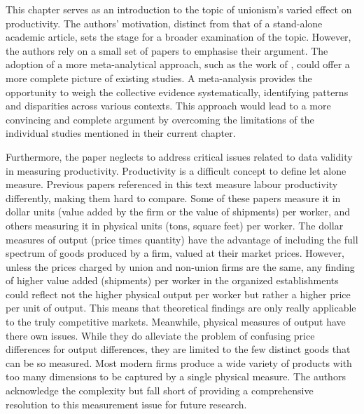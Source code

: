 \documentclass[11pt]{article}
\newcommand{\bb}{\bigbreak\noindent}
\begin{document}
\begin{spacing}{1.7}
	\bb
	This chapter serves as an introduction to the topic of unionism's varied effect on productivity. The authors' motivation, distinct from that of a stand-alone academic article, sets the stage for a broader examination of the topic. However, the authors rely on a small set of papers to emphasise their argument. The adoption of a more meta-analytical approach, such as the work of \cite{doucouliagos2003unions}, could offer a more complete picture of existing studies. A meta-analysis provides the opportunity to weigh the collective evidence systematically, identifying patterns and disparities across various contexts. This approach would lead to a more convincing and complete argument by overcoming the limitations of the individual studies mentioned in their current chapter. 
	
	\bb
	Furthermore, the paper neglects to address critical issues related to data validity in measuring productivity. Productivity is a difficult concept to define let alone measure. Previous papers referenced in this text measure labour productivity differently, making them hard to compare. Some of these papers measure it in dollar units (value added by the firm or the value of shipments) per worker, and others measuring it in physical units (tons, square feet) per worker. The dollar measures of output (price times quantity) have the advantage of including the full spectrum of goods produced by a firm, valued at their market prices. However, unless the prices charged by union and non-union firms are the same, any finding of higher value added (shipments) per worker in the organized establishments could reflect not the higher physical output per worker but rather a higher price per unit of output. This means that theoretical findings are only really applicable to the truly competitive markets. Meanwhile, physical measures of output  have there own issues. While they do alleviate the problem of confusing price differences for output differences, they are limited to the few distinct goods that can be so measured. Most modern firms produce a wide variety of products with too many dimensions to be captured by a single physical measure. The authors acknowledge the complexity but fall short of providing a comprehensive resolution to this measurement issue for future research. 
	
	

\end{spacing}
\end{document}
